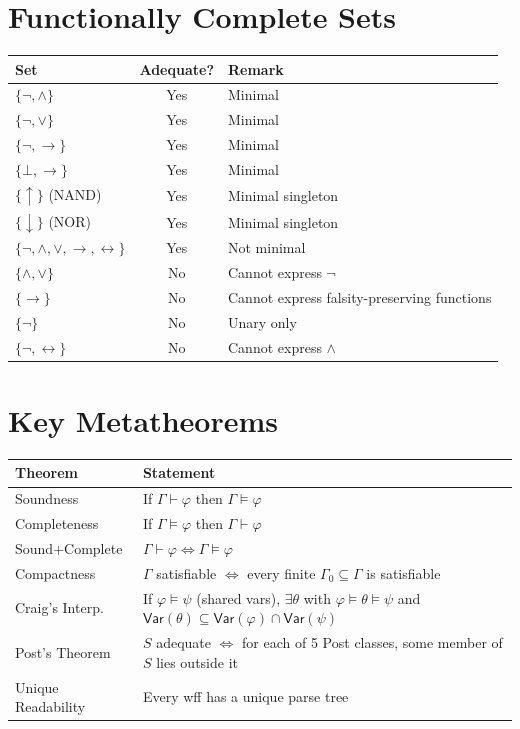 \section*{Functionally Complete Sets}

\begin{center}
\renewcommand{\arraystretch}{1.3}
\begin{tabular}{l c l}
\toprule
\textbf{Set} & \textbf{Adequate?} & \textbf{Remark} \\
\midrule
$\{\neg, \wedge\}$        & Yes & Minimal \\
$\{\neg, \vee\}$          & Yes & Minimal \\
$\{\neg, \rightarrow\}$   & Yes & Minimal \\
$\{\bot, \rightarrow\}$   & Yes & Minimal \\
$\{\uparrow\}$ (NAND)     & Yes & Minimal singleton \\
$\{\downarrow\}$ (NOR)    & Yes & Minimal singleton \\
$\{\neg,\wedge,\vee,\rightarrow,\leftrightarrow\}$ & Yes & Not minimal \\
\midrule
$\{\wedge, \vee\}$        & No  & Cannot express $\neg$ \\
$\{\rightarrow\}$         & No  & Cannot express falsity-preserving functions \\
$\{\neg\}$                & No  & Unary only \\
$\{\neg, \leftrightarrow\}$ & No & Cannot express $\wedge$ \\
\bottomrule
\end{tabular}
\end{center}

\section*{Key Metatheorems}

\begin{center}
\renewcommand{\arraystretch}{1.3}
\begin{tabular}{l p{9.5cm}}
\toprule
\textbf{Theorem} & \textbf{Statement} \\
\midrule
Soundness     & If $\Gamma \vdash \varphi$ then $\Gamma \models \varphi$ \\
Completeness  & If $\Gamma \models \varphi$ then $\Gamma \vdash \varphi$ \\
Sound+Complete & $\Gamma \vdash \varphi \Longleftrightarrow \Gamma \models \varphi$ \\
Compactness   & $\Gamma$ satisfiable $\Longleftrightarrow$ every finite $\Gamma_0 \subseteq \Gamma$ is satisfiable \\
Craig's Interp.& If $\varphi \models \psi$ (shared vars), $\exists\theta$ with $\varphi\models\theta\models\psi$ and $\mathsf{Var}(\theta)\subseteq\mathsf{Var}(\varphi)\cap\mathsf{Var}(\psi)$ \\
Post's Theorem & $S$ adequate $\Longleftrightarrow$ for each of 5 Post classes, some member of $S$ lies outside it \\
Unique Readability & Every wff has a unique parse tree \\
\bottomrule
\end{tabular}
\end{center}

